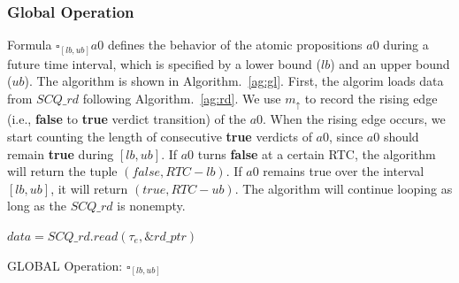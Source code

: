\subsubsection{Global Operation}
Formula $\square_{[lb,ub]} a0$ defines the behavior of the atomic propositions $a0$ during a future time interval, which is specified by a lower bound ($lb$) and an upper bound ($ub$). The algorithm is shown in Algorithm.~\ref{ag:gl}. First, the algorim loads data from $SCQ\_rd$ following Algorithm.~\ref{ag:rd}. We use $m_\uparrow$ to record the rising edge (i.e., \textbf{false} to \textbf{true} verdict transition) of the $a0$. When the rising edge occurs, we start counting the length of consecutive \textbf{true} verdicts of $a0$, since $a0$ should remain \textbf{true} during $[lb,ub]$. If $a0$ turns \textbf{false} at a certain RTC, the algorithm will return the tuple $(false, RTC-lb)$. If $a0$ remains true over the interval $[lb,ub]$, it will return $(true, RTC-ub)$. The algorithm will continue looping as long as the $SCQ\_rd$ is nonempty.
\begin{algorithm}
\SetAlgoLined
{}
$data = SCQ\_rd.read(\tau_e,\&rd\_ptr)$\;
\While{$data$ is \textbf{not} Empty}{
 $\tau_e = data.\tau +1$\;
 \If{$data.v$ \textbf{and} $!v_{pre}$}{%
    $m_\uparrow \leftarrow \tau_{pre} + 1$\;
 }
 \uIf{$data.v$}{
  \If{$data.\tau -m_\uparrow \geq ub-lb$ \textbf{and} $data.\tau - ub \geq 0$}{
      $SCQ\_wr.write([data.\tau - ub, \tt])$\;
  }}
  \ElseIf{$data.\tau -lb \geq 0$}{
      $SCQ\_wr.write([data.\tau - lb, \ff])$\;
  }
  $(\tau_{pre},v_{pre}) \leftarrow data$\;
  $data = SCQ\_rd.read(\tau_e,\&rd\_ptr)$\;
}
 \caption{\label{ag:gl}GLOBAL Operation: $\square_{[lb,ub]}$}
\end{algorithm}

